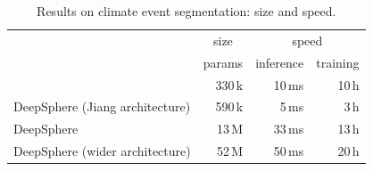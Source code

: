 \documentclass{article} %
\newcommand{\todo}[1]{{\color[rgb]{.6,.1,.6}{#1}}}
\begin{document}
\begin{table}
	\centering
	\begin{tabular}{l r r r}
		\toprule
		& \multicolumn{1}{c}{size} & \multicolumn{2}{c}{speed} \\
        \cmidrule(lr){2-2} \cmidrule(lr){3-4}
		& params & inference & training \\
		\midrule
		\cite{jiang2019sphericalcnn} & 330\,k & 10\,ms & 10\,h \\ %
		DeepSphere (Jiang architecture) & 590\,k & 5\,ms & 3\,h \\ %
        DeepSphere & 13\,M & 33\,ms & 13\,h \\ %
		DeepSphere (wider architecture) & 52\,M & 50\,ms & 20\,h \\
		\bottomrule
    \end{tabular}
    \caption{
		Results on climate event segmentation: size and speed.
	}
		\label{tab:climate:speed}
\end{table}
\pagebreak
\end{document}
